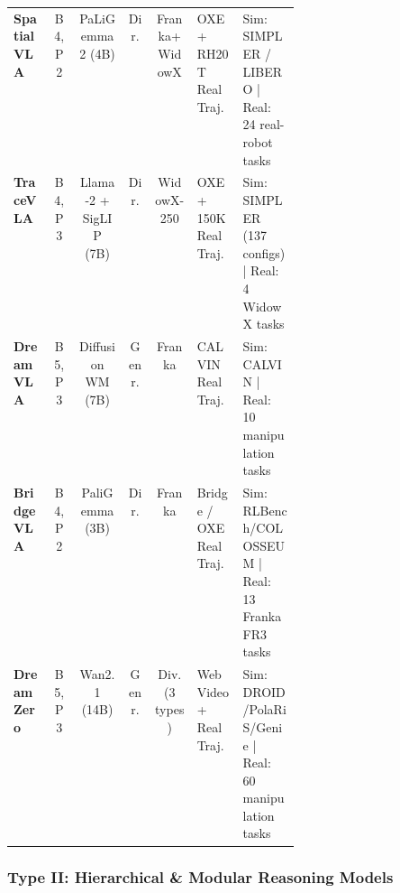 \documentclass[acmsmall,screen,review]{acmart}
\begin{document}
\begin{table}[t!]
\begin{tabular}{
  l
  c
  c
  c
  c
  p{0.168\linewidth}
  p{0.205\linewidth}
}
\textbf{SpatialVLA}~\cite{qu2025spatialvla} & B4, P2 & PaLiGemma 2 (4B) & Dir. & Franka+WidowX & OXE + RH20T Real Traj. & Sim: SIMPLER / LIBERO | Real: 24 real-robot tasks \\

\textbf{TraceVLA}~\cite{zheng2025tracevla} & B4, P3 & Llama-2 + SigLIP (7B) & Dir. & WidowX-250 & OXE + 150K Real Traj. & Sim: SIMPLER  (137 configs) | Real: 4 WidowX tasks \\

\textbf{DreamVLA}~\cite{zhang2025dreamvla} & B5, P3 & Diffusion WM (7B) & Genr. & Franka & CALVIN Real Traj. & Sim: CALVIN | Real: 10 manipulation tasks \\

\textbf{BridgeVLA}~\cite{li2025bridgevla} & B4, P2 & PaliGemma (3B) & Dir. & Franka & Bridge / OXE Real Traj. & Sim: RLBench/COLOSSEUM | Real: 13 Franka FR3 tasks \\

\textbf{DreamZero}~\cite{ye2026dreamzero} & B5, P3 & Wan2.1 (14B) & Genr. & Div. (3 types) & Web Video + Real Traj. & Sim: DROID/PolaRiS/Genie | Real: 60 manipulation tasks \\

\bottomrule
\end{tabular}
\end{table}

\subsubsection{Type II\@: Hierarchical \& Modular Reasoning Models}\label{subsec:hierarchical_modular_models}
\end{document}
